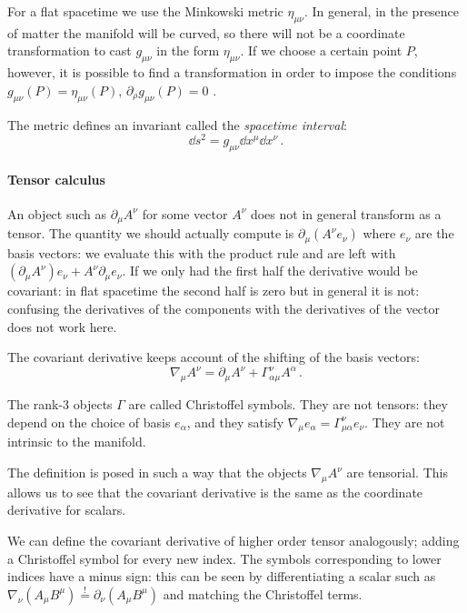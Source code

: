 \documentclass[main.tex]{subfiles}
\begin{document}
For a flat spacetime we use the Minkowski metric \(\eta_{\mu\nu}\). In general, in the presence of matter the manifold will be curved, so there will not be a coordinate transformation to cast \(g_{\mu\nu}\) in the form \(\eta_{\mu\nu}\). If we choose a certain point \(P\), however, it is possible to find a transformation in order to impose the conditions \(g_{\mu\nu}(P)=\eta_{\mu\nu}(P)\), \(\partial_\rho g_{\mu\nu}(P) = 0\) \cite[pages 49--50]{Carroll:1997ar}.

The metric defines an invariant called the \emph{spacetime interval}:
\begin{equation}
  \dd{s}^2 = g_{\mu\nu} \dd{x^\mu}\dd{x^\nu}\,.
\end{equation}

\paragraph{Tensor calculus}

An object such as \(\partial_\mu A^\nu\) for some vector \(A^\nu\) does not in general transform as a tensor. The quantity we should actually compute is \(\partial_\mu (A^\nu e_\nu)\) where \(e_\nu\) are the basis vectors: we evaluate this with the product rule and are left with \((\partial_\mu A^\nu)e_\nu + A^\nu \partial_\mu e_\nu\).
If we only had the first half the derivative would be covariant: in flat spacetime the second half is zero but in general it is not: confusing the derivatives of the components with the derivatives of the vector does not work here.

The covariant derivative keeps account of the shifting of the basis vectors:
\begin{equation}
    \nabla_\mu A^\nu = \partial_\mu A^\nu + \Gamma^\nu _{\alpha \mu}  A^\alpha \,.
\end{equation}

The rank-3 objects $\Gamma$ are called Christoffel symbols. They are not tensors: they depend on the choice of basis $e_\alpha$, and they satisfy $\nabla _\mu e_\alpha = \Gamma ^\nu _{\mu \alpha} e_\nu$. They are not intrinsic to the manifold.

The definition is posed in such a way that the objects \(\nabla_\mu A^\nu\) are tensorial. This allows us to see that the covariant derivative is the same as the coordinate derivative for scalars.

We can define the covariant derivative of higher order tensor analogously; adding a Christoffel symbol for every new index. The symbols corresponding to lower indices have a minus sign: this can be seen by differentiating a scalar such as \(\nabla_\nu (A_\mu B^\mu) \overset{!}{=}  \partial_\nu (A_\mu B^\mu)\) and matching the Christoffel terms.
\end{document}
